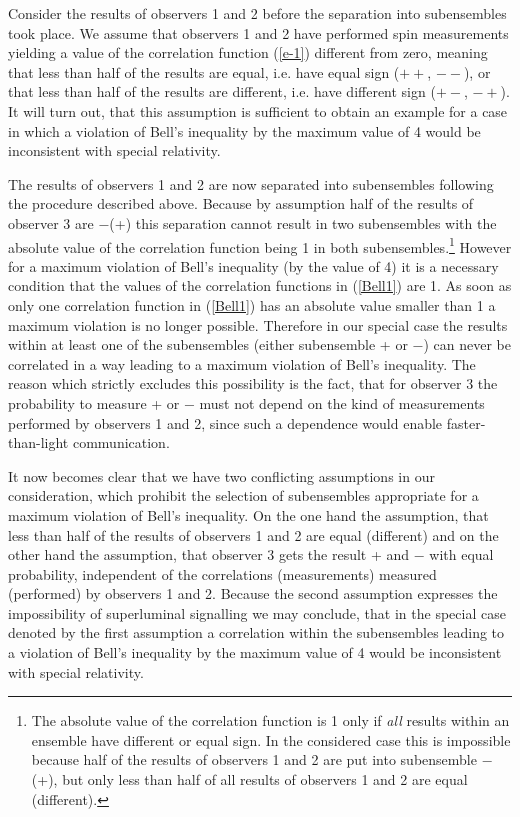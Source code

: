 Consider the results of observers 1 and 2 before the separation into subensembles took place. %
We assume that observers 1 and 2 have performed spin measurements yielding
a value of the correlation function (\ref{e-1}) different from zero, meaning that less than %
half of the results are equal, i.e. have equal sign ($++$, $--$), or that less than half of the %
results are different, i.e. have 
different sign ($+-$, $-+$). It will turn out, that this 
assumption is sufficient to obtain an example for a case in which a violation of Bell's 
inequality by the maximum value of 4 would be inconsistent with special relativity.

The results of observers 1 and 2 are now separated into subensembles following the %
procedure described above. Because by assumption half of the results of observer 3 are $-%
$(+) this separation cannot result in two subensembles with
the absolute value of the correlation function being 1 in both %
subensembles.\footnote{The absolute value of the correlation function is 1 only if {\em %
all} \rm results within an ensemble have different or equal sign. In the considered 
case this is impossible because half of the results of observers 1 and 2 are put into 
subensemble $-$ (+), but only less than half of all results of observers 1 and 2 are
equal (different).} However for a maximum violation of Bell's inequality (by the value of 4) it %
is a necessary condition that the values of the correlation functions in (\ref{Bell1}) are 1. 
As soon as only one correlation function in (\ref{Bell1}) has an absolute value smaller than %
1 a maximum violation is no longer possible. Therefore in our special case the results within %
at least one of the subensembles (either subensemble + or $-$)
can never be correlated in a way leading to a maximum violation of Bell's inequality. The %
reason which strictly excludes this possibility is the fact, that for observer 3 the probability to %
measure + or 
$-$ must not depend on the kind of measurements performed by observers 1 and 2, since %
such a dependence would enable faster-than-light communication. 

It now becomes clear that we have two conflicting assumptions in our consideration, which %
prohibit the selection of subensembles appropriate for a maximum violation of Bell's %
inequality. On the one hand the assumption, that less than half of the results of observers 1 %
and 2 are equal (different) and on the other hand the assumption, that observer 3 gets the %
result + and $-$ with equal probability, independent of the correlations (measurements) %
measured (performed) by observers 1 and 2. Because the second assumption expresses the %
impossibility of superluminal signalling we may conclude, that in the special case denoted by %
the first assumption a correlation within the subensembles leading to a violation of Bell's %
inequality by the maximum value of 4 would be inconsistent with special relativity.


